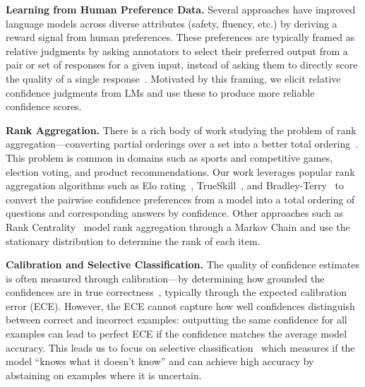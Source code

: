 \textbf{Learning from Human Preference Data.} Several approaches have improved language models across diverse attributes (safety, fluency, etc.) by deriving a reward signal from human preferences. These preferences are typically framed as relative judgments by asking annotators to select their preferred output from a pair or set of responses for a given input, instead of asking them to directly score the quality of a single response~\citep{instruct-gpt, Ziegler2019FineTuningLM, Christiano2017DeepRL}. Motivated by this framing, we elicit relative confidence judgments from LMs and use these to produce more reliable confidence scores.

\textbf{Rank Aggregation.} There is a rich body of work studying the problem of rank aggregation--–converting partial orderings over a set into a better total ordering~\citep{arrow-social-choice, Tideman1987IndependenceOC, kemeny-young, Dwork2001RankAM}. This problem is common in domains such as sports and competitive games, election voting, and product recommendations. Our work leverages popular rank aggregation algorithms such as Elo rating~\citep{elo_ratings}, TrueSkill~\citep{true_skill}, and Bradley-Terry~\citep{bradley_terry} to convert the pairwise confidence preferences from a model into a total ordering of questions and corresponding answers by confidence. Other approaches such as Rank Centrality~\citep{Negahban2012RankCR} model rank aggregation through a Markov Chain and use the stationary distribution to determine the rank of each item.

\textbf{Calibration and Selective Classification.} The quality of confidence estimates is often measured through calibration---by determining how grounded the confidences are in true correctness~\citep{murphy1977reliability,degroot1983forecasters,naeini2014binary,guo2017calibration}, typically through the expected calibration error (ECE). However, the ECE cannot capture how well confidences distinguish between correct and incorrect examples: outputting the same confidence for all examples can lead to perfect ECE if the confidence matches the average model accuracy. This leads us to focus on selective classification~\citep{elyaniv2010foundations,khani2016unanimity,feng2019selective,jones2021selective} which measures if the model “knows what it doesn’t know” and can achieve high accuracy by abstaining on examples where it is uncertain.

